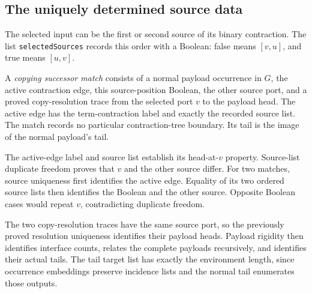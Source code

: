 
\subsection{The uniquely determined source data}

The selected input can be the first or second source of its binary
contraction. The list \texttt{selectedSources} records this order with a
Boolean: false means $[v,u]$, and true means $[u,v]$.

A \emph{copying successor match} consists of a normal payload occurrence in
$G$, the active contraction edge, this source-position Boolean, the other
source port, and a proved copy-resolution trace from the selected port $v$ to
the payload head. The active edge has the term-contraction label and exactly
the recorded source list. The match records no particular contraction-tree
boundary. Its tail is the image of the normal payload's tail.




The active-edge label and source list establish its head-at-$v$ property.
Source-list duplicate freedom proves that $v$ and the other source differ.
For two matches, source uniqueness first identifies the active edge. Equality
of its two ordered source lists then identifies the Boolean and the other
source. Opposite Boolean cases would repeat $v$, contradicting duplicate
freedom.




The two copy-resolution traces have the same source port, so the previously
proved resolution uniqueness identifies their payload heads. Payload rigidity
then identifies interface counts, relates the complete payloads recursively,
and identifies their actual tails. The tail target list has exactly the
environment length, since occurrence embeddings preserve incidence lists and
the normal tail enumerates those outputs.

